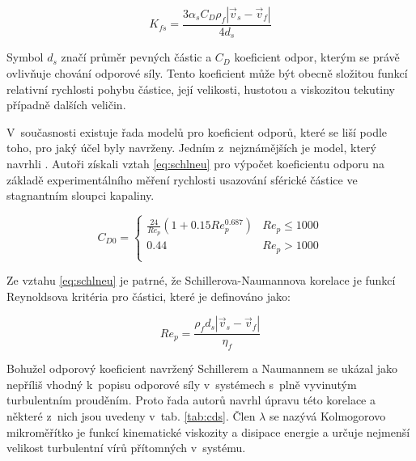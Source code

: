 \begin{equation}
	K_{fs}= \frac{3\alpha_{s}C_{D}\rho_{f}|\vec{v}_{s} - \vec{v}_{f}|}{4d_{s}}
	\label{eq:kfs}
\end{equation}
  
\noindent Symbol $d_{s}$ značí průměr pevných částic a $C_{D}$ koeficient odpor, kterým se právě ovlivňuje chování odporové síly. Tento koeficient může být obecně složitou funkcí relativní rychlosti pohybu částice, její velikosti, hustotou a viskozitou tekutiny případně dalších veličin.   

V~současnosti existuje řada modelů pro koeficient odporů, které se liší podle toho, pro jaký účel byly navrženy. Jedním z~nejznámějších je model, který navrhli \citet{schi32}. Autoři získali vztah \ref{eq:schlneu} pro výpočet koeficientu odporu na základě experimentálního měření rychlosti usazování sférické částice ve stagnantním sloupci kapaliny.    
 
	\hypertarget{hyp:schlneu}{} 
\begin{equation}
	\label{eq:schlneu}
  C_{D0} = \left\{ \begin{array}{ll}
  \frac{24}{Re_{p}}  \left( 1 + \num{0.15}Re_{p}^{\num{0.687}} \right) & Re_{p} \le 1000\\
  \num{0.44} & Re_{p} > 1000\\
  \end{array} \right.
\end{equation}

\noindent Ze vztahu \ref{eq:schlneu} je patrné, že Schillerova-Naumannova korelace je funkcí Reynoldsova kritéria pro částici, které je definováno jako:

\begin{equation}
	Re_{p}= \frac{\rho_{f}d_{s}|\vec{v}_{s} - \vec{v}_{f}|}{\eta_{f}}
	\label{eq:reyp}
\end{equation}

Bohužel odporový koeficient navržený Schillerem a Naumannem se ukázal jako nepříliš vhodný k~popisu odporové síly v~systémech s~plně vyvinutým turbulentním prouděním. Proto řada autorů navrhl úpravu této korelace a některé z~nich jsou uvedeny v~tab. \ref{tab:cds}. Člen $\lambda$ se nazývá Kolmogorovo mikroměřítko je funkcí kinematické viskozity a disipace energie a určuje nejmenší velikost turbulentní vírů přítomných v~systému. 


